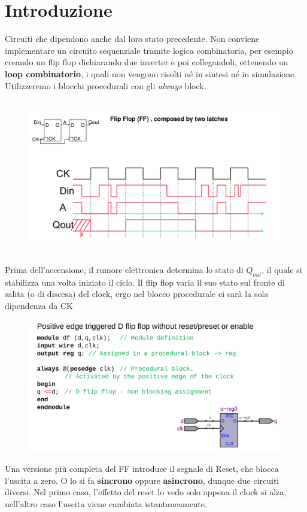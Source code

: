 \documentclass{book}
\begin{document}
    \section{Introduzione}
        Circuiti che dipendono anche dal loro stato precedente. Non conviene implementare un circuito sequenziale tramite logica combinatoria, per esempio creando un flip flop dichiarando due inverter e poi collegandoli, ottenendo un \textbf{loop combinatorio}, i quali non vengono risolti né in sintesi né in simulazione. Utilizzeremo i blocchi procedurali con gli \textit{always} block. \\ \\
        \begin{figure}[h!]
            \centering
            \includegraphics[width=0.5\linewidth]{img/Chapt11img1.png}
        \end{figure} \\
        Prima dell'accensione, il rumore elettronica determina lo stato di $Q_{out}$, il quale si stabilizza una volta iniziato il ciclo. Il flip flop varia il suo stato sul fronte di salita (o di discesa) del clock, ergo nel blocco procedurale ci sarà la sola dipendenza da CK\newpage
        \begin{figure}[h!]
            \centering
            \includegraphics[width=0.75\linewidth]{img/chapt11img2.png}
        \end{figure} 
        Una versione più completa del FF introduce il segnale di Reset, che blocca l'uscita a zero. O lo si fa \textbf{sincrono} oppure \textbf{asincrono}, dunque due circuiti diversi. Nel primo caso, l'effetto del reset lo vedo solo appena il clock si alza, nell'altro caso l'uscita viene cambiata istantaneamente.
\end{document}
